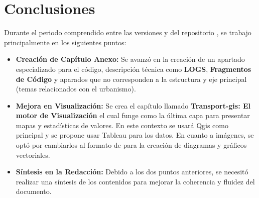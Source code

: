 
\section{Conclusiones}
\label{sec:conclusiones}


Durante el periodo comprendido entre las versiones \texttt{\VerRef}
y \texttt{\VerActual} del repositorio \texttt{\NombreRepo}, se trabajo principalmente 
en los siguientes puntos:
\begin{itemize}
    \item \textbf{Creación de Capítulo Anexo:} Se avanzó en la creación de un apartado especializado 
    para el código, descripción técnica como \textbf{LOGS}, \textbf{Fragmentos de Código} y aparados 
    que no corresponden a la estructura y eje principal (temas relacionados con el urbanismo).
    \item \textbf{Mejora en Visualización:} Se crea el capítulo llamado \textbf{Transport-gis: El motor de Visualización} 
    el cual funge como la última capa para presentar mapas y estadísticas de valores. En este contexto se usará Qgis como principal 
    y se propone usar Tableau para los datos. En cuanto a imágenes, se optó por cambiarlos al formato de  para 
    la creación de diagramas y gráficos vectoriales.
    \item \textbf{Síntesis en la Redacción:} Debido a los dos puntos anteriores, se necesitó realizar una síntesis de los contenidos 
    para mejorar la coherencia y fluidez del documento.
\end{itemize}
